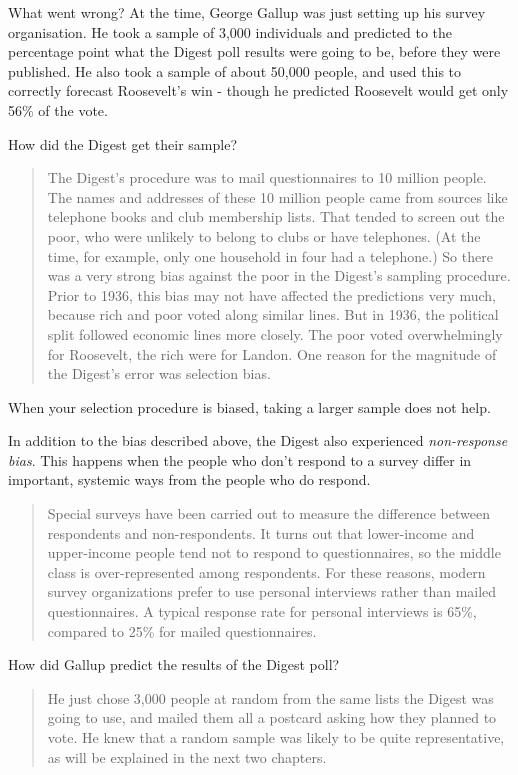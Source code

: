 \documentclass[
]{book}
\begin{document}
What went wrong? At the time, George Gallup was just setting up his survey organisation. He took a sample of 3,000 individuals and predicted to the percentage point what the Digest poll results were going to be, before they were published. He also took a sample of about 50,000 people, and used this to correctly forecast Roosevelt's win - though he predicted Roosevelt would get only 56\% of the vote.

How did the Digest get their sample?

\begin{quote}
The Digest's procedure was to mail questionnaires to 10 million people. The names and addresses of these 10 million people came from sources like telephone books and club membership lists. That tended to screen out the poor, who were unlikely to belong to clubs or have telephones. (At the time, for example, only one household in four had a telephone.) So there was a very strong bias against the poor in the Digest's sampling procedure. Prior to 1936, this bias may not have affected the predictions very much, because rich and poor voted along similar lines. But in 1936, the political split followed economic lines more closely. The poor voted overwhelmingly for Roosevelt, the rich were for Landon. One reason for the magnitude of the Digest's error was selection bias.
\end{quote}

When your selection procedure is biased, taking a larger sample does not help.

In addition to the bias described above, the Digest also experienced \emph{non-response bias}. This happens when the people who don't respond to a survey differ in important, systemic ways from the people who do respond.

\begin{quote}
Special surveys have been carried out to measure the difference between respondents and non-respondents. It turns out that lower-income and upper-income people tend not to respond to questionnaires, so the middle class is over-represented among respondents. For these reasons, modern survey organizations prefer to use personal interviews rather than mailed questionnaires. A typical response rate for personal interviews is 65\%, compared to 25\% for mailed questionnaires.
\end{quote}

How did Gallup predict the results of the Digest poll?

\begin{quote}
He just chose 3,000 people at random from the same lists the Digest was going to use, and mailed them all a postcard asking how they planned to vote. He knew that a random sample was likely to be quite representative, as will be explained in the next two chapters.
\end{quote}
\end{document}
